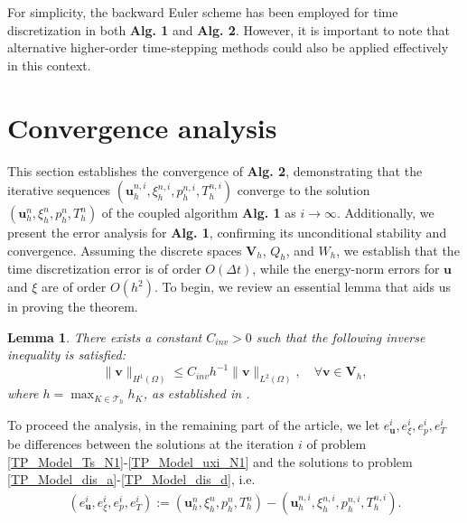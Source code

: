\documentclass{article}
\newtheorem{lemma}{Lemma}[section]
\newtheorem{remark}{Remark}
\numberwithin{equation}{section}
\begin{document}

For simplicity, the backward Euler scheme has been employed for time discretization in both \textbf{Alg. 1} and \textbf{Alg. 2}. However, it is important to note that alternative higher-order time-stepping methods could also be applied effectively in this context.

\section{Convergence analysis}\label{sec: convergence analysis}
This section establishes the convergence of \textbf{Alg. 2}, demonstrating that the iterative sequences \((\bm u_h^{n,i}, \xi_h^{n,i}, p_h^{n,i}, T_h^{n,i})\) converge to the solution \((\bm u_h^{n}, \xi_h^{n}, p_h^{n}, T_h^{n})\) of the coupled algorithm \textbf{Alg. 1} as \(i \to \infty\). Additionally, we present the error analysis for \textbf{Alg. 1}, confirming its unconditional stability and convergence. Assuming the discrete spaces \(\bm V_h\), \(Q_h\), and \(W_h\), we establish that the time discretization error is of order \(O(\Delta t)\), while the energy-norm errors for \(\bm u\) and \(\xi\) are of order \(O(h^2)\). To begin, we review an essential lemma that aids us in proving the theorem.
\begin{lemma}\label{inverse inequ}
There exists a constant \(C_{inv} > 0\) such that the following inverse inequality is satisfied:  
\[
\|\bm v\|_{H^1(\Omega)} \leq C_{inv} h^{-1} \|\bm v\|_{L^2(\Omega)}, \quad \forall \bm v \in \bm V_h,
\]
where \(h = \max_{K \in \mathcal{T}_h} h_K\), as established in \cite{ciarlet2002finite}.
\end{lemma} 


To proceed the analysis, in the remaining part of the article, we
let $e_{\bm u}^i,e_{\xi}^i,e_{p}^i,e_{T}^i$ be differences between the solutions at the iteration $i$ of problem \eqref{TP_Model_Ts_N1}-\eqref{TP_Model_uxi_N1} and
the solutions to problem \eqref{TP_Model_dis_a}-\eqref{TP_Model_dis_d}, i.e.
\begin{equation}\label{diff_iter_real}
\begin{aligned} 
     (e_{\bm u}^i,e_{\xi}^i,e_{p}^i,e_{T}^i):=(\bm u_h^{n},\xi_h^{n},p_h^{n},T_h^{n})
                                             -(\bm u_h^{n,i},\xi_h^{n,i},p_h^{n,i},T_h^{n,i}).
\end{aligned}
\end{equation}
\end{document}
